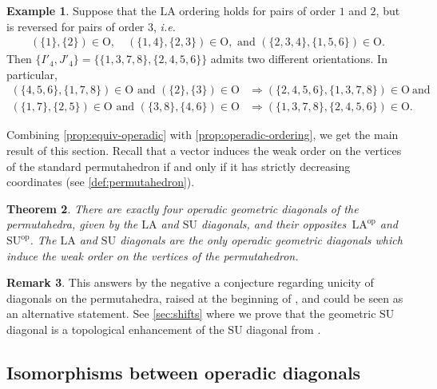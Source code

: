\documentclass{amsart}
\newtheorem{theorem}{Theorem}[section]
\theoremstyle{definition}
\newtheorem{example}[theorem]{Example}
\newtheorem{remark}[theorem]{Remark}
\newcommand{\Or}{\mathrm{O}} %
\newcommand{\ie}{\textit{i.e.}~} %
\newcommand{\SU}{\mathrm{SU}}
\newcommand{\LA}{\mathrm{LA}}
\newcommand{\op}{\mathrm{op}}
\begin{document}
\begin{example} 
\label{ex:Non-coherent order contradiction}
Suppose that the $\LA$ ordering holds for pairs of order $1$ and $2$, but is reversed for pairs of order $3$, \ie
\begin{align*}
	(\{1\}, \{2\}) \in \Or, \quad (\{1,4\}, \{2,3\}) \in \Or, \text{ and } (\{2, 3, 4\}, \{1, 5, 6 \}) \in \Or.
\end{align*}
Then $\{I'_4,J'_4\}=\{\{1, 3, 7, 8\}, \{2, 4, 5, 6\}\}$ admits two different orientations.
In particular, 
\begin{align*}
	(\{ 4, 5, 6 \} , \{1, 7, 8\}) \in \Or \text{ and } (\{2\}, \{3\}) \in \Or & \Longrightarrow (\{2, 4, 5, 6\}, \{1, 3, 7, 8\} ) \in \Or \ \text{and} \\
	(\{1, 7\}, \{2, 5\}) \in \Or \text{ and } (\{3, 8\}, \{4, 6\}) \in \Or & \Longrightarrow (\{1, 3, 7, 8\}, \{2, 4, 5, 6\}) \in \Or.
\end{align*}
\end{example}

Combining \cref{prop:equiv-operadic} with \cref{prop:operadic-ordering}, we get the main result of this section.
Recall that a vector induces the weak order on the vertices of the standard permutahedron if and only if it has strictly decreasing coordinates (see \cref{def:permutahedron}).

\begin{theorem}
\label{prop:unique-operad}
There are exactly four operadic geometric diagonals of the permutahedra, given by the $\LA$ and $\SU$ diagonals, and their opposites~$\LA^{\op}$ and $\SU^{\op}$. 
The $\LA$ and $\SU$ diagonals are the only operadic geometric diagonals which induce the weak order on the vertices of the permutahedron.
\end{theorem}

\begin{remark}
This answers by the negative a conjecture regarding unicity of diagonals on the permutahedra, raised at the beginning of \cite[Sect.~3]{SaneblidzeUmble}, and could be seen as an alternative statement. 
See \cref{sec:shifts} where we prove that the geometric $\SU$ diagonal is a topological enhancement of the $\SU$ diagonal from \cite{SaneblidzeUmble}.
\end{remark}


\subsection{Isomorphisms between operadic diagonals}
\label{subsec:isos-LA-SU}
\end{document}
